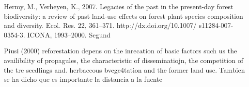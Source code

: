 Hermy, M., Verheyen, K., 2007. Legacies of the past in the present-day forest
biodiversity: a review of past land-use effects on forest plant species
composition and diversity. Ecol. Res. 22, 361–371. http://dx.doi.org/10.1007/
s11284-007-0354-3.
ICONA, 1993–2000. Segund


Piusi (2000) reforestation depens on the inrecation of basic factors such us the availibility of propagules, the characteristic of disseminatiojn, the competition of the tre seedlings and. herbaceous bvege4tation and the former land use. Tambien se ha dicho que es importante la distancia a la fuente 